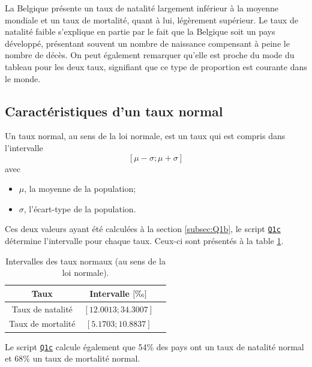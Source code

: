 \documentclass[a4paper, 12pt]{article}
\begin{document}
	La Belgique présente un taux de natalité largement inférieur à la moyenne mondiale et un taux de mortalité, quant à lui, légèrement supérieur. Le taux de natalité faible s'explique en partie par le fait que la Belgique soit un pays développé, présentant souvent un nombre de naissance compensant à peine le nombre de décès. On peut également remarquer qu'elle est proche du mode du tableau pour les deux taux, signifiant que ce type de proportion est courante dans le monde.
	
	\subsection{Caractéristiques d'un taux normal}
	Un taux normal, au sens de la loi normale, est un taux qui est compris dans l'intervalle
	\begin{displaymath}
	    \left [\mu - \sigma; \mu + \sigma \right ]
	\end{displaymath}
	avec
	
	\begin{itemize}
	    \item \(\mu\), la moyenne de la population;
	    \item \(\sigma\), l'écart-type de la population.
	\end{itemize}
	
	Ces deux valeurs ayant été calculées à la section \ref{subsec:Q1b}, le script \hyperref[subsec:code-Q1]{\texttt{Q1c}} détermine l'intervalle pour chaque taux. Ceux-ci sont présentés à la table \ref{tab:Q1c}.\par
	
	\begin{table}[!ht]
	    \centering
	    \begin{tabular}{|c|c|c|}
	        \hline
	        \textbf{Taux} & \textbf{Intervalle} \(\left [\text{\textperthousand} \right ]\)\\ \hline
	        \hline
	        Taux de natalité & \(\left [\num{12.0013}; \num{34.3007} \right]\)\\ \hline
	        Taux de mortalité & \(\left [\num{5.1703}; \num{10.8837} \right]\)\\ \hline
	    \end{tabular}
	    \caption{Intervalles des taux normaux (au sens de la loi normale).}
	    \label{tab:Q1c}
	\end{table}
	
	Le script \hyperref[subsec:code-Q1]{\texttt{Q1c}} calcule également que 54\% des pays ont un taux de natalité normal et 68\% un taux de mortalité normal.\par
	
\end{document}
